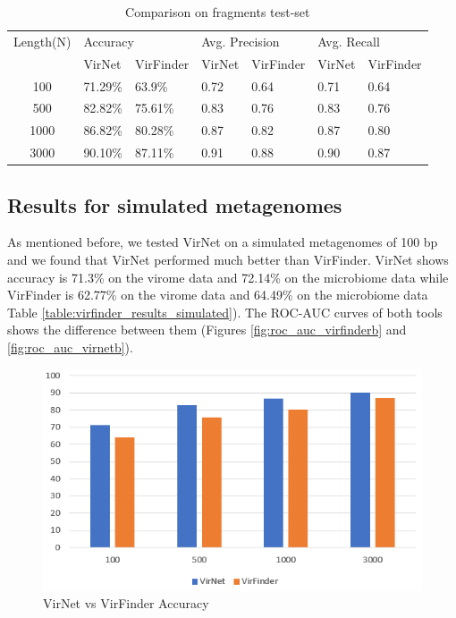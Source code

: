 \begin{table}[!htbp]
	\centering
	\begin{tabular}{||c l l l l l l||} 
		Length(N) &	\multicolumn{2}{l}{Accuracy} & \multicolumn{2}{l}{Avg. Precision} & \multicolumn{2}{l}{Avg. Recall}\\ [0.5ex] 
		& VirNet & VirFinder & VirNet & VirFinder & VirNet & VirFinder \\
		\hline\hline
		100 & 71.29\% &	63.9\%	& 0.72 & 0.64 & 0.71 & 0.64 \\
		500 & 82.82\% &	75.61\% & 0.83 &	0.76 & 0.83 & 0.76\\
		1000 & 86.82\% &	80.28\% &  0.87 & 0.82 & 0.87 & 0.80 \\
		3000 & 90.10\% &	87.11\% & 0.91 & 0.88 & 0.90 & 0.87 \\[1ex]
	\end{tabular}
	\caption{Comparison on fragments test-set}
	\label{table:virfinder_results}
\end{table}

\subsection{Results for simulated metagenomes}

As mentioned before, we tested VirNet on a simulated metagenomes of 100 bp and we found that VirNet performed much better than VirFinder. VirNet shows accuracy is 71.3\% on the virome data and 72.14\% on the microbiome data while VirFinder is 62.77\% on the virome data and 64.49\% on the microbiome data Table \ref{table:virfinder_results_simulated}). The ROC-AUC curves of both tools shows the difference between them (Figures \ref{fig:roc_auc_virfinderb} and \ref{fig:roc_auc_virnetb}).

\begin{figure}
	\centering
	\includegraphics[width=\columnwidth]{Pictures/accuracy_graph.PNG}
	\caption{VirNet vs VirFinder Accuracy}
	\label{fig:accuracy_graph}
\end{figure}


